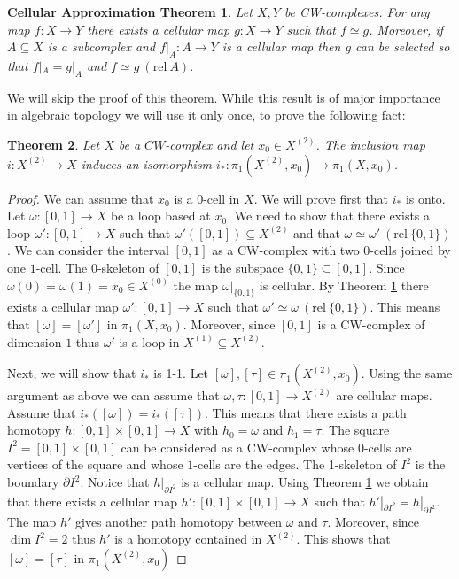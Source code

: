 \documentclass[11pt, letterpaper, oneside]{report}
\theoremstyle{pplain}
\newtheorem{theorem}{Theorem}[chapter]
\newtheorem{CELLAPPROXTHM}[theorem]{Cellular Approximation Theorem}
\theoremstyle{ddefinition}
\theoremstyle{nnn}
\theoremstyle{eexercise}
\newcommand{\rel}{\mathrm{rel\ }}
\begin{document}
\begin{CELLAPPROXTHM}
\label{CELLAPPROX THM}
Let $X, Y$ be CW-complexes. For any map $f\colon X \to Y$ there exists a cellular map 
$g\colon X \to Y$ such that $f\simeq g$. Moreover, if $A\subseteq X$ is a subcomplex and 
$f|_{A}\colon A \to Y$ is a cellular map then $g$ can be selected so that   
$f|_{A} = g|_{A}$ and $f\simeq g \ (\rel A)$.
\end{CELLAPPROXTHM}

We will skip the proof of this theorem.  While this result is  of major importance in algebraic topology we will use 
it only once, to prove the following fact:

\begin{theorem}
\label{FPI12SKINC THM }
Let $X$ be a $CW$-complex and let $x_{0} \in X^{(2)}$. The inclusion map $i\colon X^{(2)} \to X$
induces an isomorphism $i_{\ast}\colon \pi_{1}(X^{(2)}, x_{0}) \to \pi_{1}(X, x_{0})$.
\end{theorem}

\begin{proof}
We can assume that $x_{0}$ is a $0$-cell in $X$. We will prove first that $i_{\ast}$ is onto. 
Let $\omega\colon [0, 1] \to X$ be a loop based at $x_{0}$. We need to show that there exists 
a loop $\omega'\colon [0, 1] \to X$ such that $\omega'([0, 1])\subseteq X^{(2)}$ and that 
$\omega\simeq \omega' \ (\rel \{0, 1\})$. 
We can consider the interval $[0, 1]$ as a CW-complex with two $0$-cells joined by one $1$-cell. 
The $0$-skeleton of $[0, 1]$ is the subspace $\{0, 1\}\subseteq [0, 1]$. 
Since  $\omega(0) = \omega(1) = x_{0}\in X^{(0)}$ the map $\omega|_{\{0, 1\}}$ is cellular. 
By Theorem \ref{CELLAPPROX THM} there exists a cellular map $\omega'\colon [0, 1] \to X$
such that $\omega'\simeq \omega \ (\rel \{0, 1\})$. This means that $[\omega] = [\omega']$ 
in $\pi_{1}(X, x_{0})$. Moreover, since $[0, 1]$ is a CW-complex of dimension $1$ thus 
$\omega'$ is a loop in $X^{(1)}\subseteq X^{(2)}$. 
 
 Next, we will show that $i_{\ast}$ is 1-1. Let $[\omega], [\tau]\in \pi_{1}(X^{(2)}, x_{0})$.
Using the same argument as above we can assume that $\omega, \tau \colon [0, 1] \to X^{(2)}$
are cellular maps. Assume that $i_{\ast}([\omega]) = i_{\ast}([\tau])$. This means that 
there exists a path homotopy $h\colon [0, 1]\times [0, 1] \to X$ with $h_{0} = \omega$ 
and $h_{1} = \tau$. The square $I^{2} = [0, 1]\times [0, 1]$ can be considered as a CW-complex  
whose $0$-cells are vertices of the square and whose $1$-cells are the edges.
The 1-skeleton of $I^{2}$ is  the boundary $\partial I^{2}$. Notice that 
$h|_{\partial I^{2}}$ is a cellular map. Using Theorem \ref{CELLAPPROX THM} we obtain that there 
exists a cellular map $h'\colon [0, 1]\times [0, 1] \to X$ such that $h'|_{\partial I^{2}} = h|_{\partial I^{2}}$.  
The map  $h'$ gives another path homotopy between $\omega$ and $\tau$. Moreover, since 
$\dim I^{2} = 2$ thus $h'$ is a homotopy contained in $X^{(2)}$. This shows that 
$[\omega] = [\tau]$ in $\pi_{1}(X^{(2)}, x_{0})$
 
\end{proof}
\end{document}
